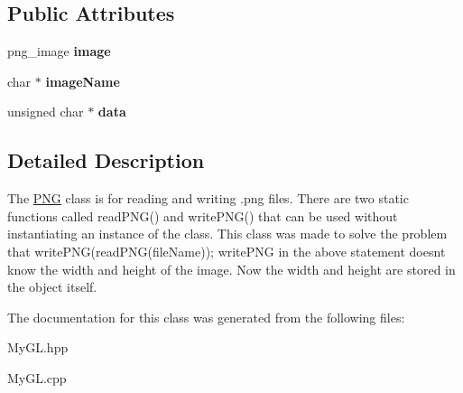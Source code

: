 \subsection*{Public Attributes}
\begin{DoxyCompactItemize}
\item 
\hypertarget{classPNG_adcccee60854d7ef75c4f516b26d9be7e}{}png\+\_\+image {\bfseries image}\label{classPNG_adcccee60854d7ef75c4f516b26d9be7e}

\item 
\hypertarget{classPNG_af06d37031363a6e28cd16cde17fe87bf}{}char $\ast$ {\bfseries image\+Name}\label{classPNG_af06d37031363a6e28cd16cde17fe87bf}

\item 
\hypertarget{classPNG_af96e0999d0c4b3fb0219462daf297d92}{}unsigned char $\ast$ {\bfseries data}\label{classPNG_af96e0999d0c4b3fb0219462daf297d92}

\end{DoxyCompactItemize}


\subsection{Detailed Description}
The \hyperlink{classPNG}{P\+N\+G} class is for reading and writing \textquotesingle{}.png\textquotesingle{} files. There are two static functions called read\+P\+N\+G() and write\+P\+N\+G() that can be used without instantiating an instance of the class. This class was made to solve the problem that write\+P\+N\+G(read\+P\+N\+G(file\+Name)); write\+P\+N\+G in the above statement doesn\textquotesingle{}t know the width and height of the image. Now the width and height are stored in the object itself. 

The documentation for this class was generated from the following files\+:\begin{DoxyCompactItemize}
\item 
My\+G\+L.\+hpp\item 
My\+G\+L.\+cpp\end{DoxyCompactItemize}
